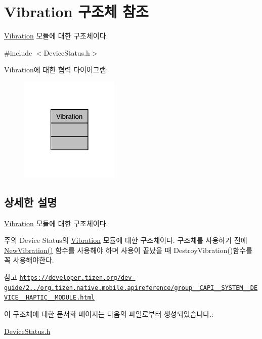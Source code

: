 \hypertarget{struct_vibration}{\section{Vibration 구조체 참조}
\label{struct_vibration}
}


\hyperlink{struct_vibration}{Vibration} 모듈에 대한 구조체이다.  




{\ttfamily \#include $<$Device\-Status.\-h$>$}



Vibration에 대한 협력 다이어그램\-:\nopagebreak
\begin{figure}[H]
\begin{center}
\leavevmode
\includegraphics[width=134pt]{d3/de2/struct_vibration__coll__graph}
\end{center}
\end{figure}


\subsection{상세한 설명}
\hyperlink{struct_vibration}{Vibration} 모듈에 대한 구조체이다. 

\begin{DoxyNote}{주의}
Device Status의 \hyperlink{struct_vibration}{Vibration} 모듈에 대한 구조체이다. 구조체를 사용하기 전에 \hyperlink{_device_status_8h_a0ec310def9439efd69610eadcd0e9678}{New\-Vibration()} 함수를 사용해야 하며 사용이 끝났을 때 Destroy\-Vibration()함수를 꼭 사용해야한다. 
\end{DoxyNote}
\begin{DoxySeeAlso}{참고}
\href{https://developer.tizen.org/dev-guide/2.3.0/org.tizen.native.mobile.apireference/group__CAPI__SYSTEM__DEVICE__HAPTIC__MODULE.html}{\tt https\-://developer.\-tizen.\-org/dev-\/guide/2../org.\-tizen.\-native.\-mobile.\-apireference/group\-\_\-\-\_\-\-C\-A\-P\-I\-\_\-\-\_\-\-S\-Y\-S\-T\-E\-M\-\_\-\-\_\-\-D\-E\-V\-I\-C\-E\-\_\-\-\_\-\-H\-A\-P\-T\-I\-C\-\_\-\-\_\-\-M\-O\-D\-U\-L\-E.\-html} 
\end{DoxySeeAlso}


이 구조체에 대한 문서화 페이지는 다음의 파일로부터 생성되었습니다.\-:\begin{DoxyCompactItemize}
\item 
\hyperlink{_device_status_8h}{Device\-Status.\-h}\end{DoxyCompactItemize}
